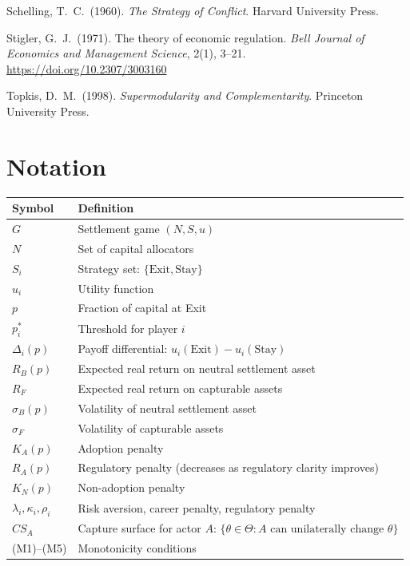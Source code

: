 \documentclass[12pt]{article}
\theoremstyle{definition}
\theoremstyle{remark}
\begin{document}
\begin{description}[style=nextline,leftmargin=0pt,labelsep=0pt,font=\normalfont]
\item Schelling, T.\ C.\ (1960). \emph{The Strategy of Conflict}. Harvard
University Press.

\item Stigler, G.\ J.\ (1971). The theory of economic regulation. \emph{Bell
Journal of Economics and Management Science}, 2(1), 3--21.
\url{https://doi.org/10.2307/3003160}

\item Topkis, D.\ M.\ (1998). \emph{Supermodularity and Complementarity}.
Princeton University Press.

\end{description}


\appendix

\section{Notation}

\begin{table}[h]
\centering
\begin{tabularx}{\textwidth}{lX}
\toprule
Symbol & Definition \\
\midrule
$G$ & Settlement game $(N, S, u)$ \\
$N$ & Set of capital allocators \\
$S_i$ & Strategy set: $\{\text{Exit}, \text{Stay}\}$ \\
$u_i$ & Utility function \\
$p$ & Fraction of capital at Exit \\
$p_i^*$ & Threshold for player $i$ \\
$\Delta_i(p)$ & Payoff differential: $u_i(\text{Exit}) - u_i(\text{Stay})$ \\
$R_B(p)$ & Expected real return on neutral settlement asset \\
$R_F$ & Expected real return on capturable assets \\
$\sigma_B(p)$ & Volatility of neutral settlement asset \\
$\sigma_F$ & Volatility of capturable assets \\
$K_A(p)$ & Adoption penalty \\
$R_A(p)$ & Regulatory penalty (decreases as regulatory clarity improves) \\
$K_N(p)$ & Non-adoption penalty \\
$\lambda_i, \kappa_i, \rho_i$ & Risk aversion, career penalty, regulatory penalty \\
$CS_A$ & Capture surface for actor $A$: $\{\theta \in \Theta : A \text{ can unilaterally change } \theta\}$ \\
(M1)--(M5) & Monotonicity conditions \\
\bottomrule
\end{tabularx}
\end{table}
\end{document}
